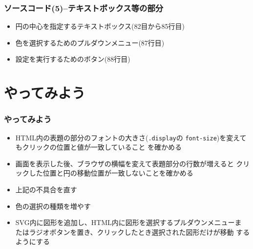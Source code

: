 \begin{frame}[containsverbatim]
 \frametitle{ソースコード(5)--テキストボックス等の部分}
 \begin{itemize}
  \item 円の中心を指定するテキストボックス(82目から85行目)
  \item 色を選択するためのプルダウンメニュー(87行目)
  \item 設定を実行するためのボタン(88行目)
 \end{itemize}
\end{frame}
 \section{やってみよう}
\begin{frame}[containsverbatim]
  \frametitle{やってみよう}
 \begin{itemize}
  \item HTML内の表題の部分のフォントの大きさ(\texttt{.display}の
        \texttt{font-size})を変えてもクリックの位置と値が一致していること
        を確かめる
  \item 画面を表示した後、ブラウザの横幅を変えて表題部分の行数が増えると
        クリックした位置と円の移動位置が一致しないことを確かめる
  \item 上記の不具合を直す
  \item 色の選択の種類を増やす
  \item SVG内に図形を追加し、HTML内に図形を選択するプルダウンメニューま
        たはラジオボタンを置き、クリックしたとき選択された図形だけが移動
        するようにする
 \end{itemize}
\end{frame}

\begin{frame}[containsverbatim]
 \frametitle{}
\end{frame}
